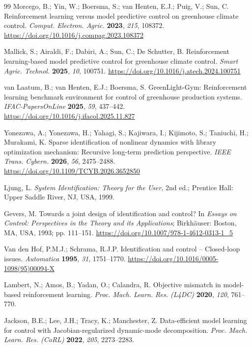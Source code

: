 \begin{thebibliography}{99}
Morcego, B.; Yin, W.; Boersma, S.; van Henten, E.J.; Puig, V.; Sun, C. Reinforcement learning
versus model predictive control on greenhouse climate control. \textit{Comput. Electron.
Agric.} \textbf{2023}, \textit{215}, 108372.
\url{https://doi.org/10.1016/j.compag.2023.108372}

Mallick, S.; Airaldi, F.; Dabiri, A.; Sun, C.; De Schutter, B. Reinforcement learning-based
model predictive control for greenhouse climate control. \textit{Smart Agric. Technol.}
\textbf{2025}, \textit{10}, 100751. \url{https://doi.org/10.1016/j.atech.2024.100751}

van Laatum, B.; van Henten, E.J.; Boersma, S. GreenLight-Gym: Reinforcement learning
benchmark environment for control of greenhouse production systems.
\textit{IFAC-PapersOnLine} \textbf{2025}, \textit{59}, 437--442.
\url{https://doi.org/10.1016/j.ifacol.2025.11.827}

Yonezawa, A.; Yonezawa, H.; Yahagi, S.; Kajiwara, I.; Kijimoto, S.; Taniuchi, H.;
Murakami, K. Sparse identification of nonlinear dynamics with library optimization mechanism:
Recursive long-term prediction perspective. \textit{IEEE Trans. Cybern.} \textbf{2026},
\textit{56}, 2475--2488. \url{https://doi.org/10.1109/TCYB.2026.3652850}

Ljung, L. \textit{System Identification: Theory for the User}, 2nd ed.; Prentice Hall:
Upper Saddle River, NJ, USA, 1999.

Gevers, M. Towards a joint design of identification and control? In \textit{Essays on
Control: Perspectives in the Theory and its Applications}; Birkh\"auser: Boston, MA, USA,
1993; pp. 111--151. \url{https://doi.org/10.1007/978-1-4612-0313-1_5}

Van den Hof, P.M.J.; Schrama, R.J.P. Identification and control -- Closed-loop issues.
\textit{Automatica} \textbf{1995}, \textit{31}, 1751--1770.
\url{https://doi.org/10.1016/0005-1098(95)00094-X}

Lambert, N.; Amos, B.; Yadan, O.; Calandra, R. Objective mismatch in model-based
reinforcement learning. \textit{Proc. Mach. Learn. Res. (L4DC)} \textbf{2020}, \textit{120},
761--770.

Jackson, B.E.; Lee, J.H.; Tracy, K.; Manchester, Z. Data-efficient model learning for
control with Jacobian-regularized dynamic-mode decomposition.
\textit{Proc. Mach. Learn. Res. (CoRL)} \textbf{2022}, \textit{205}, 2273--2283.


\end{thebibliography}
